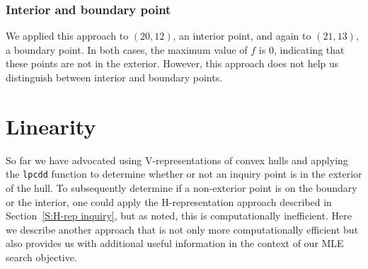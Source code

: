 \subsubsection{Interior and boundary point}
We applied this approach to $(20,12)$, an interior point, and again to $(21,13)$,
 a boundary point.  In both cases, the maximum value of $f$ is 0, 
indicating that these points are not in the exterior.  However, this 
 approach does not help us distinguish between interior and boundary points.

\section{Linearity}\label{S:linearity}
So far we have advocated using V-representations of convex hulls and applying
the \texttt{lpcdd} function to determine whether or not an inquiry point is
in the exterior of the hull.  To subsequently determine if a non-exterior point 
is on the boundary or the interior, one could apply the 
H-representation approach described in 
Section~\ref{S:H-rep inquiry}, but as noted, this is computationally inefficient.
Here we describe another approach that is not only more computationally efficient
but also provides us with additional useful information in the context of our
MLE search objective.

